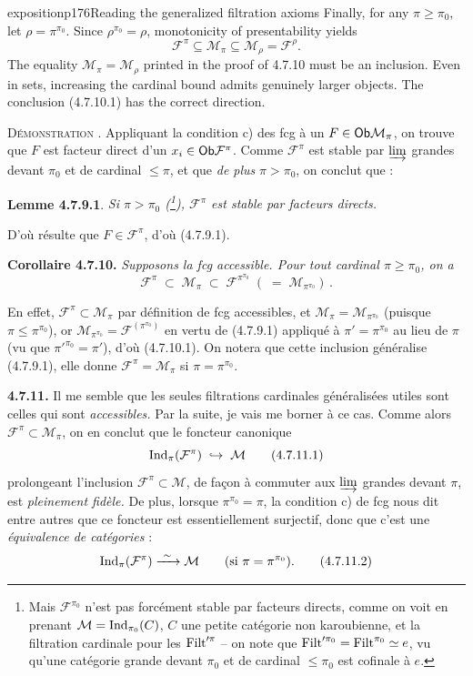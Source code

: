 \begin{dcomment}{exposition}{p176}{Reading the generalized filtration axioms}
Finally, for any $\pi\geq\pi_0$, let $\rho=\pi^{\pi_0}$. Since $\rho^{\pi_0}=\rho$, monotonicity of presentability yields
\[
 \mathcal F^\pi\subseteq\mathcal M_\pi
 \subseteq\mathcal M_\rho=\mathcal F^\rho.
\]
The equality $\mathcal M_\pi=\mathcal M_\rho$ printed in the proof of 4.7.10 must be an inclusion. Even in sets, increasing the cardinal bound admits genuinely larger objects. The conclusion (4.7.10.1) has the correct direction.
\end{dcomment}


\textsc{Démonstration} . Appliquant la condition c) des fcg à un $F\in\mathsf{Ob}\mathcal{M}_\pi$, on trouve que $F$ est facteur direct d'un $x_i\in\mathsf{Ob}\mathcal{F}^{\pi}$. Comme $\mathcal{F}^{\pi}$ est stable par $\varinjlim$ grandes devant $\pi_0$ et de cardinal $\leqslant\pi$, et que \textit{de plus} $\pi>\pi_0$, on conclut que :

\textbf{Lemme 4.7.9.1}. \textit{Si $\pi>\pi_0$ (\footnote[76]{Mais $\mathcal{F}^{\pi_0}$ n'est pas forcément stable par facteurs directs, comme on voit en prenant $\mathcal{M}=\operatorname{Ind}_{\pi_0}(C)$, $C$ une petite catégorie non karoubienne, et la filtration cardinale pour les $\mathrm{Filt}'^{\pi}$ -- on note que $\mathrm{Filt}'^{\pi_0}=\mathrm{Filt}^{\pi_0}\simeq e$, vu qu'une catégorie grande devant $\pi_0$ et de cardinal $\leqslant\pi_0$ est cofinale à $e$.}), $\mathcal{F}^{\pi}$ est stable par facteurs directs.}

D'où résulte que $F\in\mathcal{F}^{\pi}$, d'où (4.7.9.1).

\textbf{Corollaire 4.7.10.} \textit{Supposons la fcg accessible. Pour tout cardinal $\pi\geqslant\pi_0$, on a}
\[
\mathcal{F}^{\pi} \;\subset\; \mathcal{M}_\pi \;\subset\; \mathcal{F}^{\pi^{\pi_0}} \; ( \;=\; \mathcal{M}_{\pi^{\pi_0}}) \, . \tag*{(4.7.10.1)}
\]

En effet, $\mathcal{F}^{\pi}\subset\mathcal{M}_\pi$ par définition de fcg accessibles, et $\mathcal{M}_\pi=\mathcal{M}_{\pi^{\pi_0}}$ (puisque $\pi\leqslant\pi^{\pi_0}$), or $\mathcal{M}_{\pi^{\pi_0}}=\mathcal{F}^{(\pi^{\pi_0})}$ en vertu de (4.7.9.1) appliqué à $\pi'=\pi^{\pi_0}$ au lieu de $\pi$ (vu que $\pi'^{\pi_0}=\pi'$), d'où (4.7.10.1). On notera que cette inclusion généralise (4.7.9.1), elle donne $\mathcal{F}^{\pi}=\mathcal{M}_\pi$ si $\pi=\pi^{\pi_0}$.

\textbf{4.7.11.} Il me semble que les seules filtrations cardinales généralisées utiles sont celles qui sont \textit{accessibles.} Par la suite, je vais me borner à ce cas. Comme alors $\mathcal{F}^{\pi}\subset\mathcal{M}_\pi$, on en conclut
que le foncteur canonique
\[
\Ind_\pi(\mathcal{F}^{\pi}) \;\hookrightarrow\; \mathcal{M} \tag*{(4.7.11.1)}
\]
prolongeant l'inclusion $\mathcal{F}^{\pi}\subset\mathcal{M}$, de façon à commuter aux $\varinjlim$ grandes devant $\pi$, est \textit{pleinement fidèle.} De plus, lorsque $\pi^{\pi_0}=\pi$, la condition c) de fcg nous dit entre autres que ce foncteur est essentiellement surjectif, donc que c'est une \textit{équivalence de catégories} :
\[
\Ind_\pi(\mathcal{F}^{\pi}) \xrightarrow{\ \sim\ } \mathcal{M} \qquad (\text{si } \pi=\pi^{\pi_0}). \tag*{(4.7.11.2)}
\]

